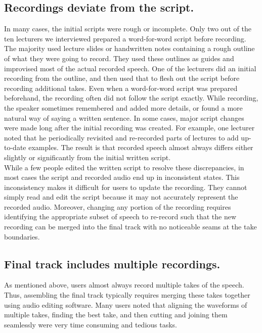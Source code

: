 \subsection*{Recordings deviate from the script.} 
In many cases, the initial scripts were rough or incomplete. Only two out of the ten lecturers we interviewed prepared a word-for-word script before recording. The majority used lecture slides or handwritten notes containing a rough outline of what they were going to record. They used these outlines as guides and improvised most of the actual recorded speech. One of the lecturers did an initial recording from the outline, and then used that to flesh out the script before recording additional takes. Even when a word-for-word script was prepared beforehand, the recording often did not follow the script exactly. While recording, the speaker sometimes remembered and added more details, or found a more natural way of saying a written sentence. In some cases, major script changes were made long after the initial recording was created. For example, one lecturer noted that he periodically revisited and re-recorded parts of lectures to add up-to-date examples. The result is that recorded speech almost always differs either slightly or significantly from the initial written script. \\

While a few people edited the written script to resolve these discrepancies, in most cases the script and recorded audio end up in inconsistent states. This inconsistency makes it difficult for users to update the recording. They cannot simply read and edit the script because it may not accurately represent the recorded audio. Moreover,  changing any portion of the recording requires identifying the appropriate subset of speech to re-record such that the new recording can be merged into the final track with no noticeable seams at the take boundaries.  

\subsection*{Final track includes multiple recordings.} 
As mentioned above, users almost always record multiple takes of the speech. Thus, assembling the final track typically requires merging these takes together using audio editing software. Many users noted that aligning the waveforms of multiple takes, finding the best take, and then cutting and joining them seamlessly were very time consuming and tedious tasks.

